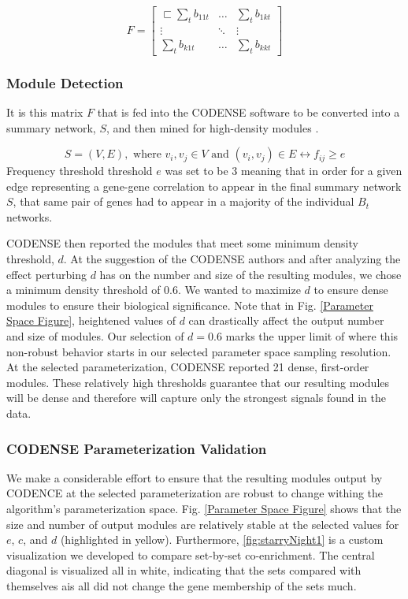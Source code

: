 \documentclass[10pt,letterpaper]{article}
\begin{document}
\begin{equation}\label{equation5}
F = \left[ \begin{array}{ccc}\sqsubset
\sum_{t}b_{11t} & \ldots & \sum_{t}b_{1kt} \\
\vdots & \ddots & \vdots \\
\sum_{t}b_{k1t} & \ldots & \sum_{t}b_{kkt} \end{array} \right]
\end{equation}

\subsubsection{Module Detection}
It is this matrix $F$ that is fed into the CODENSE software to be converted into a summary network, $S$, and then mined for high-density modules \cite{Hu2005}.  

\begin{equation}\label{equation6}
S=(V,E), \text{ where } v_i,v_j \in V \text{ and } (v_i,v_j) \in E \leftrightarrow f_{ij} \ge e
\end{equation}
Frequency threshold threshold $e$ was set to be 3 meaning that in order for a given edge representing a gene-gene correlation to appear in the final summary network $S$, that same pair of genes had to appear in a majority of the individual $B_t$ networks. 

CODENSE then reported the modules that meet some minimum density threshold, $d$. At the suggestion of the CODENSE authors and after analyzing the effect perturbing $d$ has on the number and size of the resulting modules, we chose a minimum density threshold of 0.6. We wanted to maximize $d$ to ensure dense modules to ensure their biological significance. Note that in Fig. \ref{Parameter Space Figure}, heightened values of $d$ can drastically affect the output number and size of modules. Our selection of $d = 0.6$ marks the upper limit of where this non-robust behavior starts in our selected parameter space sampling resolution. At the selected parameterization, CODENSE reported 21 dense, first-order modules. These relatively high thresholds  guarantee that our resulting modules will be dense and therefore will capture only the strongest signals found in the data.

\subsubsection*{CODENSE Parameterization Validation}
We make a considerable effort to ensure that the resulting modules output by CODENCE at the selected parameterization are robust to change withing the algorithm's parameterization space. Fig. \ref{Parameter Space Figure} shows that the size and number of output modules are relatively stable at the selected values for $e$, $c$, and $d$ (highlighted in yellow). Furthermore, \ref{fig:starryNight1} is a custom visualization we developed to compare set-by-set co-enrichment. The central diagonal is visualized all in white, indicating that the sets compared with themselves ais all did not change the gene membership of the sets much. 
\end{document}
